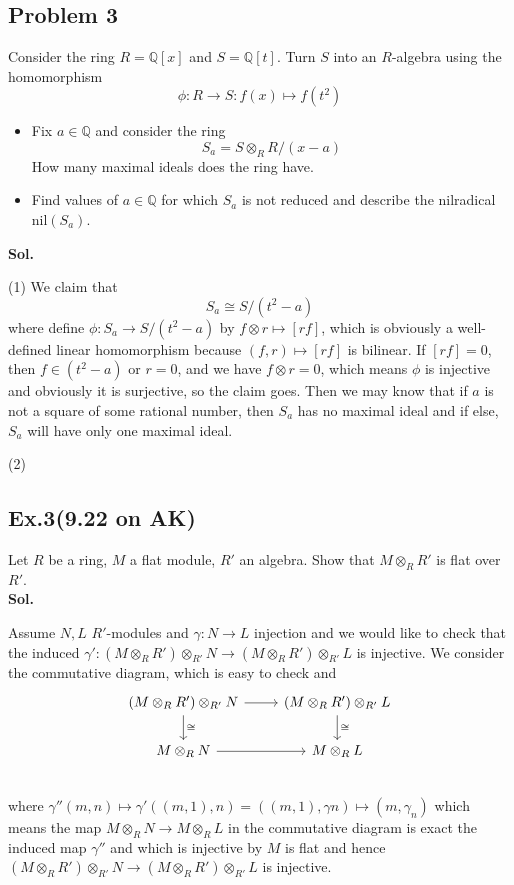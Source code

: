 \documentclass[lang=en,11pt,a4paper,citestyle =authoryear]{elegantpaper}
\begin{document}
\subsection*{Problem 3} 
Consider the ring $R = \mathbb{Q}[x]$ and $S = \mathbb{Q}[t]$. Turn $S$ into an $R$-algebra using the homomorphism
\[\phi:R\to S:f(x) \mapsto f(t^2)\]
\begin{itemize}
\item Fix $a\in\mathbb{Q}$ and consider the ring
    \[S_a = S \otimes_R R/(x-a)\]
    How many maximal ideals does the ring have.
\item Find values of $a\in\mathbb{Q}$ for which $S_a$ is not reduced and describe the nilradical $\text{nil}(S_a)$.
\end{itemize}
\vspace{0.5em}
\textbf{Sol.} \par
    (1) We claim that
    \[S_a \cong S/(t^2-a)\]
    where define $\phi:S_a \to S/(t^2 - a)$ by $f\otimes r \mapsto [rf]$, which is obviously a well-defined linear homomorphism because $(f,r) \mapsto [rf]$ is bilinear. If $[rf] = 0$, then $ f\in (t^2 - a)$ or $r=0$, and we have $f\otimes r = 0$, which means $\phi$ is injective and obviously it is surjective, so the claim goes. Then we may know that if $a$ is not a square of some rational number, then $S_a$ has no maximal ideal and if else, $S_a$ will have only one maximal ideal.\par
    (2)
\vspace{0.5em}

\subsection*{Ex.3(9.22 on AK)} 
Let $R$ be a ring, $M$ a flat module, $R'$ an algebra. Show that $M\otimes_R R'$ is flat over $R'$.
\vspace{0.5em}\\
\textbf{Sol.} \par
Assume $N,L$ $R'$-modules and $\gamma: N\to L$ injection and we would like to check that the induced $\gamma':(M\otimes_R R')\otimes_{R'} N \to (M\otimes_R R')\otimes_{R'} L$ is injective. We consider the commutative diagram, which is easy to check and
\[
\begin{tikzcd}
    (M\otimes_R R')\otimes_{R'} N\arrow[d,"\cong"]\arrow[r] & (M\otimes_R R')\otimes_{R'} L\arrow[d,"\cong"] \\
M \otimes_R N\arrow[r] & M\otimes_R L \\
\end{tikzcd}
\]
where $\gamma''(m,n) \mapsto \gamma'((m,1),n) = ((m,1),\gamma n)\mapsto (m,\gamma_n)$
which means the map $M\otimes_R N \to M\otimes_R L$ in the commutative diagram is exact the induced map $\gamma''$ and which is injective by $M$ is flat and hence $(M\otimes_R R')\otimes_{R'} N\to (M\otimes_R R')\otimes_{R'} L$ is injective.
\par 
\vspace{0.5em}
\end{document}
